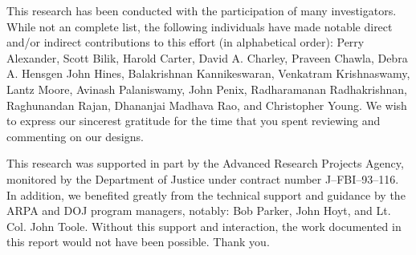 \documentclass[11pt]{report}
\begin{document}
This research has been conducted with the participation of many
investigators.  While not an complete list, the following individuals
have made notable direct and/or indirect contributions to this effort
(in alphabetical order):
Perry Alexander,
Scott Bilik,
Harold Carter,
David A. Charley,
Praveen Chawla,
Debra A. Hensgen
John Hines,
Balakrishnan Kannikeswaran,
Venkatram Krishnaswamy,
Lantz Moore,
Avinash Palaniswamy,
John Penix,
Radharamanan Radhakrishnan,
Raghunandan Rajan, 
Dhananjai Madhava Rao, and
Christopher Young.
We wish to express our sincerest gratitude for the time that you spent
reviewing and commenting on our designs.

This research was supported in part by the Advanced Research Projects
Agency, monitored by the Department of Justice under contract number
J--FBI--93--116.  In addition, we benefited greatly from the technical
support and guidance by the ARPA and DOJ program managers, notably:
Bob Parker,
John Hoyt, and
Lt. Col. John Toole.
Without this support and interaction, the work documented in this report
would not have been possible.  Thank you.
\end{document}
